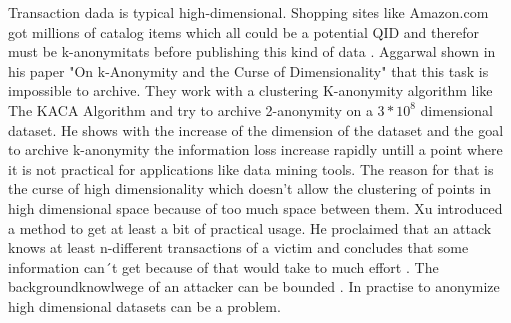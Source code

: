 \documentclass{llncs}
\begin{document}
Transaction dada is typical high-dimensional. Shopping sites like Amazon.com got millions of catalog items which all could be a potential QID and therefor must be k-anonymitats before publishing this kind of data \cite{wang2010privacy}. Aggarwal shown in his paper "On k-Anonymity and the Curse of Dimensionality" that this task is impossible to archive. They work with a clustering K-anonymity algorithm like The KACA Algorithm and try to archive 2-anonymity on a $3*10^8$ dimensional dataset. He shows with the increase of the dimension of the dataset and the goal to archive k-anonymity the information loss increase rapidly untill a point where it is not practical for applications like data mining tools. The reason for that is the curse of high dimensionality which doesn't allow the clustering of points in high dimensional space because of too much space between them. Xu introduced a method to get at least a bit of practical usage. He proclaimed that an attack knows at least n-different transactions of a victim and concludes that some information can´t get because of that would take to much effort \cite{xu2008publishing}. The backgroundknowlwege of an attacker can be bounded \cite{aggarwal2005k}. In practise to anonymize high dimensional datasets can be a problem.  

\end{document}

